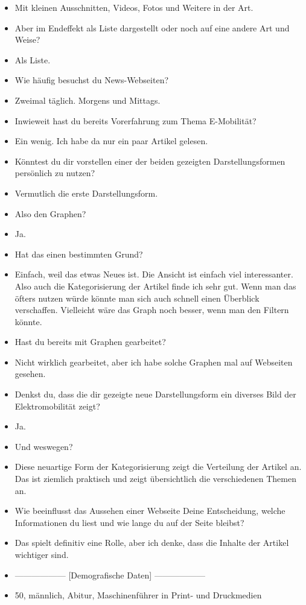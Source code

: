 {\begin{itemize}[]
        \item {} Mit kleinen Ausschnitten, Videos, Fotos und Weitere in der Art.
        \item {} Aber im Endeffekt als Liste dargestellt oder noch auf eine andere Art und Weise?
        \item {} Als Liste.
        \item {} Wie häufig besuchst du News-Webseiten?
        \item {} Zweimal täglich. Morgens und Mittags.
        \item {} Inwieweit hast du bereits Vorerfahrung zum Thema E-Mobilität?
        \item {} Ein wenig. Ich habe da nur ein paar Artikel gelesen.
        \item {} Könntest du dir vorstellen einer der beiden gezeigten Darstellungsformen persönlich zu nutzen?
        \item {} Vermutlich die erste Darstellungsform.
        \item {} Also den Graphen?
        \item {} Ja.
        \item {} Hat das einen bestimmten Grund?
        \item {} Einfach, weil das etwas Neues ist.
              Die Ansicht ist einfach viel interessanter.
              Also auch die Kategorisierung der Artikel finde ich sehr gut.
              Wenn man das öfters nutzen würde könnte man sich auch schnell einen Überblick verschaffen.
              Vielleicht wäre das Graph noch besser, wenn man den Filtern könnte.
        \item {} Hast du bereits mit Graphen gearbeitet?
        \item {} Nicht wirklich gearbeitet, aber ich habe solche Graphen mal auf Webseiten gesehen.
        \item {} Denkst du, dass die dir gezeigte neue Darstellungsform ein diverses Bild der Elektromobilität zeigt?
        \item {} Ja.
        \item {} Und weswegen?
        \item {} Diese neuartige Form der Kategorisierung zeigt die Verteilung der Artikel an.
              Das ist ziemlich praktisch und zeigt übersichtlich die verschiedenen Themen an.
        \item {} Wie beeinflusst das Aussehen einer Webseite Deine Entscheidung, welche Informationen du liest und wie lange du auf der Seite bleibst?
        \item {} Das spielt definitiv eine Rolle, aber ich denke, dass die Inhalte der Artikel wichtiger sind.
        \item {------------------} [Demografische Daten] {------------------}
        \item {} 50, männlich, Abitur, Maschinenführer in Print- und Druckmedien
    \end{itemize}}
\nolinenumbers
